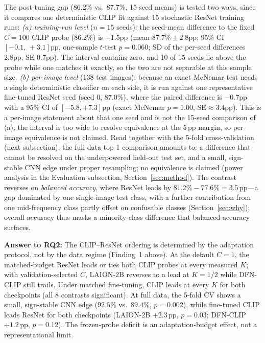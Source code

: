 \documentclass[10pt,a4paper]{article}
\begin{document}
The post-tuning gap (86.2\% vs.\ 87.7\%, 15-seed means) is tested two ways, since it compares one deterministic CLIP fit against 15 stochastic ResNet training runs:
\emph{(a) training-run level} ($n{=}15$ seeds): the seed-mean difference to the fixed $C{=}100$ CLIP probe (86.2\%) is $+1.5$pp (mean $87.7\% \pm 2.8$pp; 95\% CI $[-0.1,\,+3.1]$pp, one-sample $t$-test $p=0.060$; SD of the per-seed differences 2.8pp, SE 0.7pp). The interval contains zero, and 10 of 15 seeds lie above the probe while one matches it exactly, so the two are not separable at this sample size.
\emph{(b) per-image level} (138 test images): because an exact McNemar test needs a single deterministic classifier on each side, it is run against one representative fine-tuned ResNet seed (seed 0, 87.0\%), where the paired difference is $-0.7$pp with a 95\% CI of $[-5.8,+7.3]$pp (exact McNemar $p=1.00$, SE$\approx$3.4pp). This is a per-image statement about that one seed and is not the 15-seed comparison of (a); the interval is too wide to resolve equivalence at the 5\,pp margin, so per-image equivalence is not claimed.
Read together with the 5-fold cross-validation (next subsection), the full-data top-1 comparison amounts to: a difference that cannot be resolved on the underpowered held-out test set, and a small, sign-stable CNN edge under proper resampling; no equivalence is claimed (power analysis in the Evaluation subsection, Section~\ref{sec:method}). The contrast reverses on \emph{balanced accuracy}, where ResNet leads by $81.2\%-77.6\%=3.5$\,pp---a gap dominated by one single-image test class, with a further contribution from one mid-frequency class partly offset on confusable classes (Section~\ref{sec:why}); overall accuracy thus masks a minority-class difference that balanced accuracy surfaces.

\textbf{Answer to RQ2:} The CLIP--ResNet ordering is determined by the adaptation protocol, not by the data regime (Finding~1 above). At the default $C{=}1$, the matched-budget ResNet leads or ties both CLIP probes at every measured $K$; with validation-selected $C$, LAION-2B reverses to a lead at $K{=}1/2$ while DFN-CLIP still trails. Under matched fine-tuning, CLIP leads at every $K$ for both checkpoints (all 8 contrasts significant). At full data, the 5-fold CV shows a small, sign-stable CNN edge ($92.5\%$ vs.\ $89.4\%$, $p{=}0.002$), while fine-tuned CLIP leads ResNet for both checkpoints (LAION-2B $+2.3$\,pp, $p{=}0.03$; DFN-CLIP $+1.2$\,pp, $p{=}0.12$). The frozen-probe deficit is an adaptation-budget effect, not a representational limit.
\end{document}
